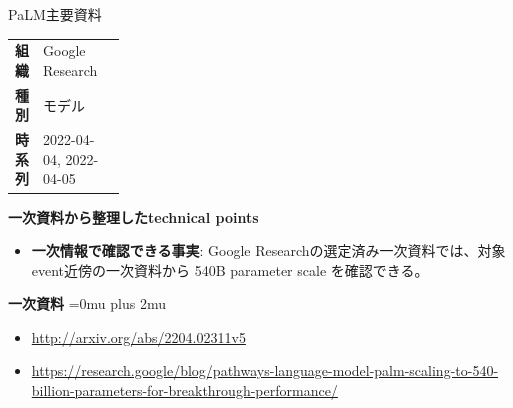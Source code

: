 \begin{technicalnote}{PaLM}{主要資料}
\begingroup
\begin{tabularx}{\linewidth}{@{}>{\bfseries}p{0.22\linewidth}X@{}}
組織 & Google Research \\
種別 & モデル \\
時系列 & 2022-04-04, 2022-04-05 \\
\end{tabularx}
\smallskip
{\bfseries 一次資料から整理したtechnical points}
\begin{itemize}[leftmargin=1.5em,itemsep=0.35em]
\item \textbf{一次情報で確認できる事実}: Google Researchの選定済み一次資料では、対象event近傍の一次資料から 540B parameter scale を確認できる。
\end{itemize}
\begin{minipage}{\linewidth}
\begin{samepage}
{\bfseries 一次資料}
\begingroup\sloppy
\Urlmuskip=0mu plus 2mu\relax
\begin{itemize}[leftmargin=1.5em,itemsep=0.25em]
\item {\scriptsize\url{http://arxiv.org/abs/2204.02311v5}}
\item {\scriptsize\url{https://research.google/blog/pathways-language-model-palm-scaling-to-540-billion-parameters-for-breakthrough-performance/}}
\end{itemize}
\endgroup
\end{samepage}
\end{minipage}
\endgroup
\end{technicalnote}
\medskip

